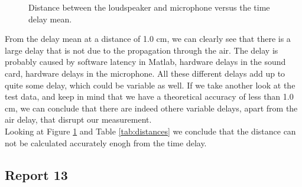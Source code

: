 \documentclass[final]{scrreprt} %
\begin{document}
\begin{figure}[H]
\centering
{}
\caption{Distance between the loudspeaker and microphone versus the time delay mean.}
\label{fig:means}
\end{figure}

From the delay mean at a distance of 1.0 cm, we can clearly see that there is a large delay that is not due to the propagation through the air.
The delay is probably caused by software latency in Matlab, hardware delays in the sound card, hardware delays in the microphone.
All these different delays add up to quite some delay, which could be variable as well.
If we take another look at the test data, and keep in mind that we have a theoretical accuracy of less than 1.0 cm, we can conclude that there are indeed othere variable delays, apart from the air delay, that disrupt our measurement.\\ 
Looking at Figure \ref{fig:means} and Table \ref{tab:distances} we conclude that the distance can not be calculated accurately enogh from the time delay. 


\subsection{Report 13}
\end{document}
